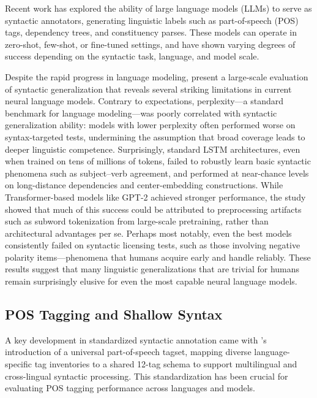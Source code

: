 Recent work has explored the ability of large language models (LLMs) to serve as syntactic annotators, generating linguistic labels such as part-of-speech (POS) tags, dependency trees, and constituency parses. These models can operate in zero-shot, few-shot, or fine-tuned settings, and have shown varying degrees of success depending on the syntactic task, language, and model scale.

Despite the rapid progress in language modeling, \citet{hu2020systematic} present a large-scale evaluation of syntactic generalization that reveals several striking limitations in current neural language models. Contrary to expectations, perplexity—a standard benchmark for language modeling—was poorly correlated with syntactic generalization ability: models with lower perplexity often performed worse on syntax-targeted tests, undermining the assumption that broad coverage leads to deeper linguistic competence. Surprisingly, standard LSTM architectures, even when trained on tens of millions of tokens, failed to robustly learn basic syntactic phenomena such as subject–verb agreement, and performed at near-chance levels on long-distance dependencies and center-embedding constructions. While Transformer-based models like GPT-2 achieved stronger performance, the study showed that much of this success could be attributed to preprocessing artifacts such as subword tokenization from large-scale pretraining, rather than architectural advantages per se. Perhaps most notably, even the best models consistently failed on syntactic licensing tests, such as those involving negative polarity items—phenomena that humans acquire early and handle reliably. These results suggest that many linguistic generalizations that are trivial for humans remain surprisingly elusive for even the most capable neural language models.

\subsection{POS Tagging and Shallow Syntax}

A key development in standardized syntactic annotation came with \citet{petrov2012universal}'s introduction of a universal part-of-speech tagset, mapping diverse language-specific tag inventories to a shared 12-tag schema to support multilingual and cross-lingual syntactic processing. This standardization has been crucial for evaluating POS tagging performance across languages and models.


